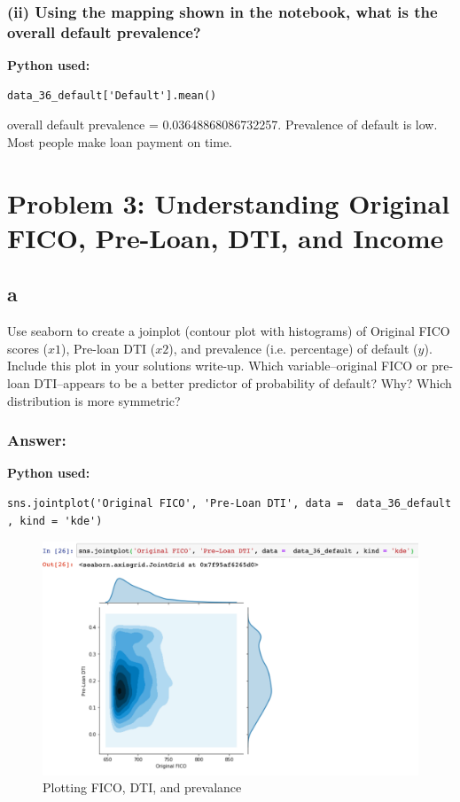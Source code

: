 \documentclass{homework}
\begin{document}
\subsubsection*{(ii) Using the mapping shown in the notebook, what is the overall default prevalence?}
\textbf{Python used:}
\begin{verbatim}
data_36_default['Default'].mean()
\end{verbatim}
overall default prevalence = 0.03648868086732257. Prevalence of default is low. Most people make loan payment on time.

\newpage
\section*{Problem 3: Understanding Original FICO, Pre-Loan, DTI, and Income}
\subsection*{a}
Use seaborn to create a joinplot (contour plot with histograms) of Original FICO scores ($x1$), Pre-loan DTI ($x2$), and prevalence (i.e. percentage) of default ($y$). Include this plot in your solutions write-up. Which variable–original FICO or pre-loan DTI–appears to be a better predictor of probability of default? Why? Which distribution is more symmetric?
\subsubsection*{Answer:}
\textbf{Python used:}
\begin{verbatim}
sns.jointplot('Original FICO', 'Pre-Loan DTI', data =  data_36_default , kind = 'kde')
\end{verbatim}

     \begin{figure}[h!]
    \centering
    \includegraphics[scale=0.50]{"seaborn.png"}
    \caption{Plotting FICO, DTI, and prevalance}
    \label{fig:original fico_hist}
    \end{figure}
\end{document}
